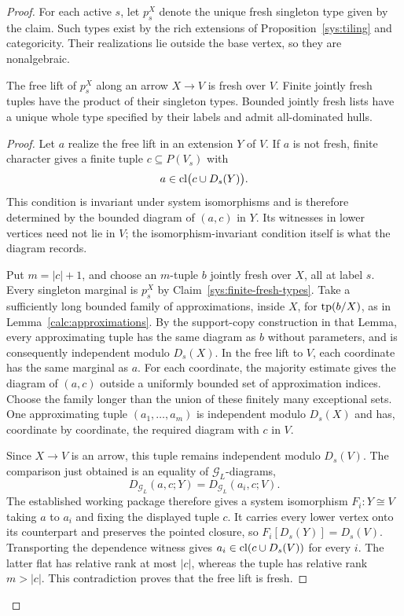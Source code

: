 \begin{proof}
For each active $s$, let $p_s^X$ denote the unique fresh singleton
type given by the claim.  Such types exist by the rich extensions
of Proposition~\ref{sys:tiling} and categoricity.  Their realizations
lie outside the base vertex, so they are nonalgebraic.

\begin{claim}
\label{sys:free-fresh}
The free lift of $p_s^X$ along an arrow $X\to V$ is fresh over $V$.
Finite jointly fresh tuples have the product of their singleton
types.  Bounded jointly fresh lists have a unique whole type
specified by their labels and admit all-dominated hulls.
\end{claim}

\begin{proof}
Let $a$ realize the free lift in an extension $Y$ of $V$.
If $a$ is not fresh, finite character gives a finite tuple
$c\subseteq P(V_s)$ with
\[
 a\in\operatorname{cl}\bigl(c\cup D_s(Y)\bigr).
\]
This condition is invariant under system isomorphisms and is
therefore determined by the bounded diagram of $(a,c)$ in $Y$.
Its witnesses in lower vertices need not lie in $V$; the
isomorphism-invariant condition itself is what the diagram
records.

Put $m=|c|+1$, and choose an $m$-tuple $b$ jointly fresh over
$X$, all at label $s$.  Every singleton marginal is $p_s^X$ by
Claim~\ref{sys:finite-fresh-types}.  Take a sufficiently long
bounded family of approximations, inside $X$, for
$\operatorname{tp}(b/X)$, as in Lemma~\ref{calc:approximations}.
By the support-copy construction in that Lemma, every
approximating tuple has the same diagram as
$b$ without parameters, and is consequently independent
modulo $D_s(X)$.  In the free lift to $V$, each coordinate has
the same marginal as $a$.  For each coordinate, the majority
estimate gives the diagram of $(a,c)$ outside a uniformly
bounded set of approximation indices.  Choose the family
longer than the union of these finitely many exceptional sets.
One approximating tuple $(a_1,\ldots,a_m)$ is independent
modulo $D_s(X)$ and has, coordinate by coordinate, the required
diagram with $c$ in $V$.

Since $X\to V$ is an arrow, this tuple remains independent
modulo $D_s(V)$.  The comparison just obtained is an equality of
$\mathcal G_L$-diagrams,
\[
 D_{\mathcal G_L}(a,c;Y)=D_{\mathcal G_L}(a_i,c;V).
\]
The established working package therefore gives a system isomorphism
$F_i:Y\cong V$ taking $a$ to $a_i$ and fixing the displayed tuple $c$.
It carries every lower vertex onto its counterpart and preserves the
pointed closure, so $F_i[D_s(Y)]=D_s(V)$.  Transporting the dependence
witness gives $a_i\in\operatorname{cl}(c\cup D_s(V))$ for every $i$.  The latter
flat has relative rank at most $|c|$, whereas the tuple has
relative rank $m>|c|$.  This contradiction proves that the
free lift is fresh.


\end{proof}
\end{proof}
